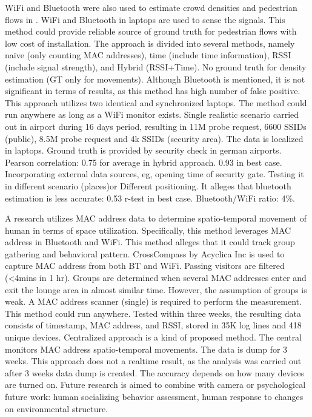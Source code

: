 WiFi and Bluetooth were also used to estimate crowd densities and pedestrian flows in \cite{thesis011}. WiFi and Bluetooth in laptops are used to sense the signals. This method could provide reliable source of ground truth for pedestrian flows with low cost of installation. The approach is divided into several methods, namely na\"{i}ve (only counting MAC addresses), time (include time information), RSSI (include signal strength), and Hybrid (RSSI+Time). No ground truth for density estimation (GT only for movements). Although Bluetooth is mentioned, it is not significant in terms of results, as this method has high number of false positive. This approach utilizes two identical and synchronized laptops. The method could run anywhere as long as a WiFi monitor exists. Single realistic scenario carried out in airport during 16 days period, resulting in 11M probe request, 6600 SSIDs (public), 8.5M probe request and 4k SSIDs (security area). The data is localized in laptops. Ground truth is provided by security check in german airports. Pearson correlation: 0.75 for average in hybrid approach. 0.93 in best case. Incorporating external data sources, eg, opening time of security gate. Testing it in different scenario (places)or Different positioning. It alleges that bluetooth estimation is less accurate: 0.53 r-test in best case. Bluetooth/WiFi ratio: 4\%.


A research \cite{thesis017} utilizes MAC address data to determine spatio-temporal movement of human in terms of space utilization. Specifically, this method leverages MAC address in Bluetooth and WiFi. This method alleges that it could track group gathering and behavioral pattern. CrossCompass by Acyclica Inc is used to capture MAC address from both BT and WiFi. Passing visitors are filtered (<4mins in 1 hr). Groups are determined when several MAC addresses enter and exit the lounge area in almost similar time. However, the assumption of groups is weak. A MAC address scanner (single) is required to perform the measurement. This method could run anywhere. Tested within three weeks, the resulting data consists of timestamp, MAC address, and RSSI, stored in 35K log lines and 418 unique devices. Centralized approach is a kind of proposed method. The central monitors MAC address spatio-temporal movements. The data is dump for 3 weeks. This approach does not a realtime result, as the analysis was carried out after 3 weeks data dump is created. The accuracy depends on how many devices are turned on. Future research is aimed to combine with camera or psychological future work: human socializing behavior assessment, human response to changes on environmental structure.

